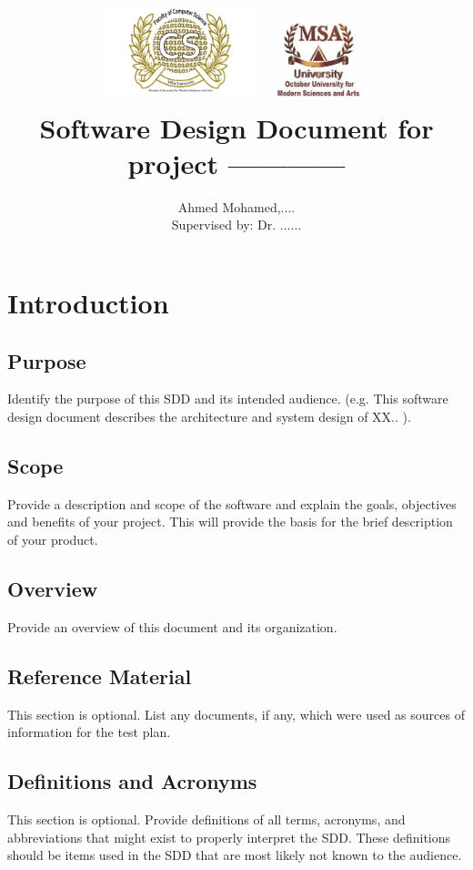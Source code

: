 \documentclass[12pt]{article}
\title{
{\includegraphics[width=4.5cm, height=3cm]{img/CSLogo.jpg}
\includegraphics[width=3cm, height=2.5cm]{img/MSALogo.jpg}}
\\
{Software Design Document for project ------------}
}
\author{Ahmed Mohamed,.... \\ Supervised by: Dr. ......}
\begin{document}
\maketitle

\section{Introduction}
\subsection{Purpose}
Identify the purpose of this SDD and its intended audience. (e.g. This software design
document describes the architecture and system design of XX.. ).


\subsection{Scope}
Provide a description and scope of the software and explain the goals, objectives and benefits
of your project. This will provide the basis for the brief description of your product.


\subsection{Overview}
Provide an overview of this document and its organization.



\subsection{Reference Material}
This section is optional.
List any documents, if any, which were used as sources of information for the test plan. 


\subsection{Definitions and Acronyms}
This section is optional.
Provide  definitions of all terms, acronyms, and  abbreviations that might exist to  properly 
interpret the SDD. These definitions should be items used in the SDD that are most likely not 
known to the audience.
\end{document}
